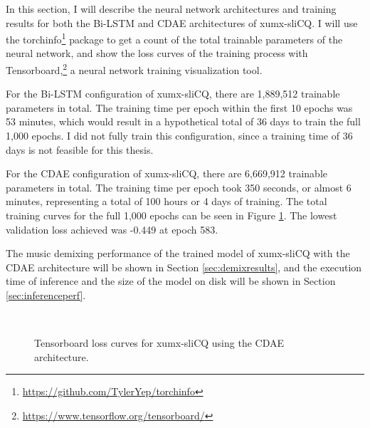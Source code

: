 \documentclass[report.tex]{subfiles}
\begin{document}
In this section, I will describe the neural network architectures and training results for both the Bi-LSTM and CDAE architectures of xumx-sliCQ. I will use the torchinfo\footnote{\url{https://github.com/TylerYep/torchinfo}} package to get a count of the total trainable parameters of the neural network, and show the loss curves of the training process with Tensorboard,\footnote{\url{https://www.tensorflow.org/tensorboard/}} a neural network training visualization tool.

For the Bi-LSTM configuration of xumx-sliCQ, there are 1,889,512 trainable parameters in total. The training time per epoch within the first 10 epochs was 53 minutes, which would result in a hypothetical total of 36 days to train the full 1,000 epochs. I did not fully train this configuration, since a training time of 36 days is not feasible for this thesis.

For the CDAE configuration of xumx-sliCQ, there are 6,669,912 trainable parameters in total. The training time per epoch took 350 seconds, or almost 6 minutes, representing a total of 100 hours or 4 days of training. The total training curves for the full 1,000 epochs can be seen in Figure \ref{fig:networkloss}. The lowest validation loss achieved was -0.449 at epoch 583.

The music demixing performance of the trained model of xumx-sliCQ with the CDAE architecture will be shown in Section \ref{sec:demixresults}, and the execution time of inference and the size of the model on disk will be shown in Section \ref{sec:inferenceperf}.

\begin{figure}[ht]
	\centering
	\\
	\caption{Tensorboard loss curves for xumx-sliCQ using the CDAE architecture.}
	\label{fig:networkloss}
\end{figure}
\end{document}
